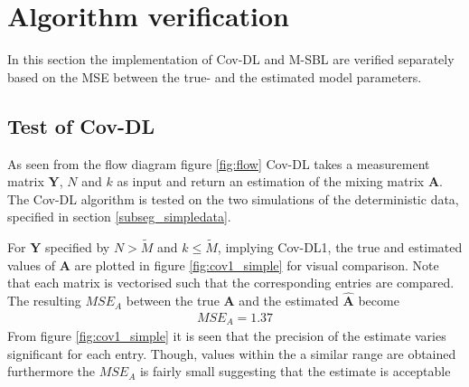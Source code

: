 \section{Algorithm verification}
In this section the implementation of Cov-DL and M-SBL are verified separately based on the MSE between the true- and the estimated model parameters.

\subsection{Test of Cov-DL}
As seen from the flow diagram figure \ref{fig:flow} Cov-DL takes a measurement matrix $\textbf{Y}$, $N$ and $k$ as input and return an estimation of the mixing matrix $\textbf{A}$. The Cov-DL algorithm is tested on the two simulations of the deterministic data, specified in section \ref{subseg_simpledata}. 

For $\textbf{Y}$ specified by $N > \widetilde{M}$ and $k\leq \widetilde{M}$, implying Cov-DL1, the true and estimated values of $\textbf{A}$ are plotted in figure \ref{fig:cov1_simple} for visual comparison. Note that each matrix is vectorised such that the corresponding entries are compared.  
The resulting $MSE_{A}$ between the true $\textbf{A}$ and the estimated $\hat{\textbf{A}}$ become 
\begin{align*}
MSE_{A} = 1.37
\end{align*}
From figure \ref{fig:cov1_simple} it is seen that the precision of the estimate varies significant for each entry. Though, values within the a similar range are obtained furthermore the $MSE_{A}$ is fairly small suggesting that the estimate is acceptable  

